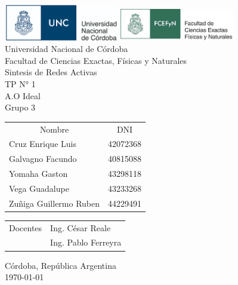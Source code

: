 \begin{titlepage}
    

\thispagestyle{empty}


\begin{center}
    \includegraphics[width=5cm]{img/unc_logo.png} \hspace{2cm}
    \includegraphics[width=5cm]{img/fcefyn_logo.jpg}
    \\[1cm]
    \vspace{5pt}
   \vspace{5pt}
    \LARGE Universidad Nacional de Córdoba\\[0.5cm] 
    \large Facultad de Ciencias Exactas, Físicas y Naturales \\[0.5cm] 
    \large Sintesis de Redes Activas
    \\[0.2cm]
    \large TP N° 1
    \\[0.2cm]
    \large A.O Ideal
    \\[0.2cm]
    \large Grupo 3
    \\[0.2cm]
    \vspace{60pt}
    \begin{table}[!h]
    \centering
    \begin{tabular}{ll}
    \multicolumn{1}{c}{Nombre} & \multicolumn{1}{c}{DNI} \\
    Cruz Enrique Luis & 42072368 \\
    Galvagno Facundo& 40815088 \\
    Yomaha Gaston & 43298118 \\
    Vega Guadalupe & 43233268 \\
    Zuñiga Guillermo Ruben & 44229491\\
    
    \end{tabular}
    \end{table}
    \vspace{20pt}
    \begin{table}[!h]
    \centering
    \begin{tabular}{ll}
    \multicolumn{1}{c}{Docentes} & Ing. César Reale \\
     & Ing. Pablo Ferreyra
    \end{tabular}
    \end{table}
    \vfill
    Córdoba, República Argentina\\
    \today
\end{center}

\end{titlepage}